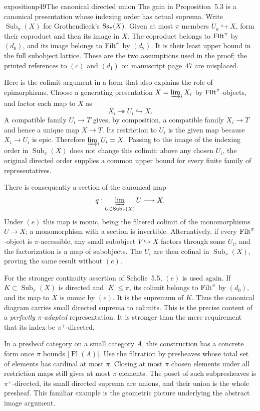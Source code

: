\begin{dcomment}{exposition}{p49}{The canonical directed union}
The gain in Proposition~5.3 is a canonical presentation whose indexing order has actual suprema. Write $\operatorname{Sub}_{\pi}(X)$ for Grothendieck's $\mathrm{Ss}_{\pi}(X)$. Given at most $\pi$ members $U_a\hookrightarrow X$, form their coproduct and then its image in $X$. The coproduct belongs to $\mathrm{Filt}^\pi$ by $(d_0)$, and its image belongs to $\mathrm{Filt}^\pi$ by $(d_2)$. It is their least upper bound in the full subobject lattice. These are the two assumptions used in the proof; the printed references to $(c)$ and $(d_1)$ on manuscript page~47 are misplaced.

Here is the colimit argument in a form that also explains the role of epimorphisms. Choose a generating presentation $X=\varinjlim_iX_i$ by $\mathrm{Filt}^\pi$-objects, and factor each map to $X$ as
\[
 X_i\twoheadrightarrow U_i\hookrightarrow X.
\]
A compatible family $U_i\to T$ gives, by composition, a compatible family $X_i\to T$ and hence a unique map $X\to T$. Its restriction to $U_i$ is the given map because $X_i\to U_i$ is epic. Therefore $\varinjlim_iU_i=X$. Passing to the image of the indexing order in $\operatorname{Sub}_{\pi}(X)$ does not change this colimit: above any chosen $U_i$, the original directed order supplies a common upper bound for every finite family of representatives.

There is consequently a section of the canonical map
\[
 q:\varinjlim_{U\in\operatorname{Sub}_{\pi}(X)}U\longrightarrow X.
\]
Under $(e)$ this map is monic, being the filtered colimit of the monomorphisms $U\to X$; a monomorphism with a section is invertible. Alternatively, if every $\mathrm{Filt}^\pi$-object is $\pi$-accessible, any small subobject $V\hookrightarrow X$ factors through some $U_i$, and the factorization is a map of subobjects. The $U_i$ are then cofinal in $\operatorname{Sub}_{\pi}(X)$, proving the same result without $(e)$.

For the stronger continuity assertion of Scholie~5.5, $(e)$ is used again. If $K\subset\operatorname{Sub}_{\pi}(X)$ is directed and $|K|\leq\pi$, its colimit belongs to $\mathrm{Filt}^\pi$ by $(d_0)$, and its map to $X$ is monic by $(e)$. It is the supremum of $K$. Thus the canonical diagram carries small directed suprema to colimits. This is the precise content of a \emph{perfectly $\pi$-adapted} representation. It is stronger than the mere requirement that its index be $\pi^+$-directed.

In a presheaf category on a small category $A$, this construction has a concrete form once $\pi$ bounds $|\operatorname{Fl}(A)|$. Use the filtration by presheaves whose total set of elements has cardinal at most $\pi$. Closing at most $\pi$ chosen elements under all restriction maps still gives at most $\pi$ elements. The poset of such subpresheaves is $\pi^+$-directed, its small directed suprema are unions, and their union is the whole presheaf. This familiar example is the geometric picture underlying the abstract image argument.
\end{dcomment}


